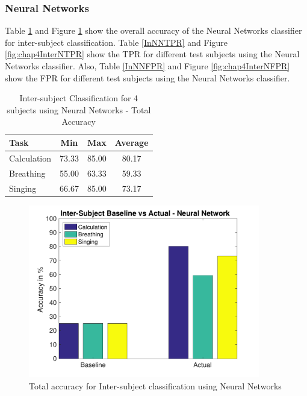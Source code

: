 		\subsubsection{Neural Networks}
    Table \ref{InNN} and Figure \ref{fig:chap4InterNT} show the overall accuracy of the Neural Networks classifier for inter-subject classification. Table \ref{InNNTPR} and Figure \ref{fig:chap4InterNTPR} show the TPR for different test subjects using the Neural Networks classifier. Also, Table \ref{InNNFPR} and Figure \ref{fig:chap4InterNFPR} show the FPR for different test subjects using the Neural Networks classifier.
		\begin{table}[h!]
			\centering
			\caption{Inter-subject Classification for 4 subjects using Neural Networks - Total Accuracy}
			\label{InNN}
			\begin{tabular}{l c c c}
				\hline
				Task &Min &Max &Average\\\hline
				Calculation &73.33 &85.00 &80.17\\
				Breathing &55.00 &63.33   &59.33\\
				Singing &66.67 &85.00     &73.17\\
			\end{tabular}
		\end{table}
 		
 		\begin{figure}[hbtp]
	    	\centering
	    	\includegraphics[width=0.90\textwidth]{Chapter-4/base_tin}
	    	\caption{Total accuracy for Inter-subject classification using Neural Networks}
	    	\label{fig:chap4InterNT}
    	\end{figure}

